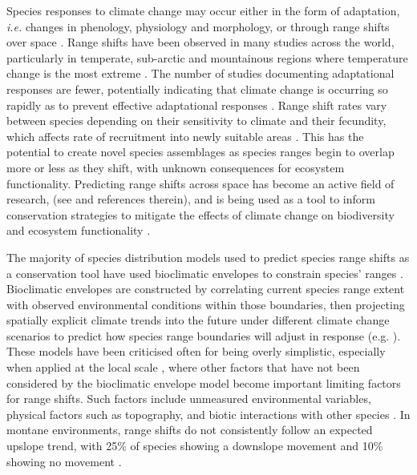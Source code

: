 \documentclass[a4paper, 11pt]{article}
\newcommand{\textapprox}{\raisebox{0.5ex}{\texttildelow}}
\begin{document}
Species responses to climate change may occur either in the form of adaptation, \textit{i.e.} changes in phenology, physiology and morphology, or through range shifts over space \citep{Bellard2012}. Range shifts have been observed in many studies across the world, particularly in temperate, sub-arctic and mountainous regions where temperature change is the most extreme \citep{Lenoir2015}. The number of studies documenting adaptational responses are fewer, potentially indicating that climate change is occurring so rapidly as to prevent effective adaptational responses \citep{Mantyka2012}. Range shift rates vary between species depending on their sensitivity to climate and their fecundity, which affects rate of recruitment into newly suitable areas \citep{MacLean2017, Travis2013}. This has the potential to create novel species assemblages as species ranges begin to overlap more or less as they shift, with unknown consequences for ecosystem functionality. Predicting range shifts across space has become an active field of research, (see \citealt{Bellard2012} and references therein), and is being used as a tool to inform conservation strategies to mitigate the effects of climate change on biodiversity and ecosystem functionality \citep{Dawson2011}.

The majority of species distribution models used to predict species range shifts as a conservation tool have used bioclimatic envelopes to constrain species' ranges \citep{Pearson2003, Sinclair2010}. Bioclimatic envelopes are constructed by correlating current species range extent with observed environmental conditions within those boundaries, then projecting spatially explicit climate trends into the future under different climate change scenarios to predict how species range boundaries will adjust in response (e.g. \citealt{Araujo2006, Berry2002, Peterson2002, Thuiller2005}). These models have been criticised often for being overly simplistic, especially when applied at the local scale \citep{McMahon2011}, where other factors that have not been considered by the bioclimatic envelope model become important limiting factors for range shifts. Such factors include unmeasured environmental variables, physical factors such as topography, and biotic interactions with other species \citep{Davis1998, Ettinger2011, Putten2010}. In montane environments, range shifts do not consistently follow an expected upslope trend, with \textapprox{}25\% of species showing a downslope movement and \textapprox{}10\% showing no movement \citep{Lenoir2010}.
\end{document}
